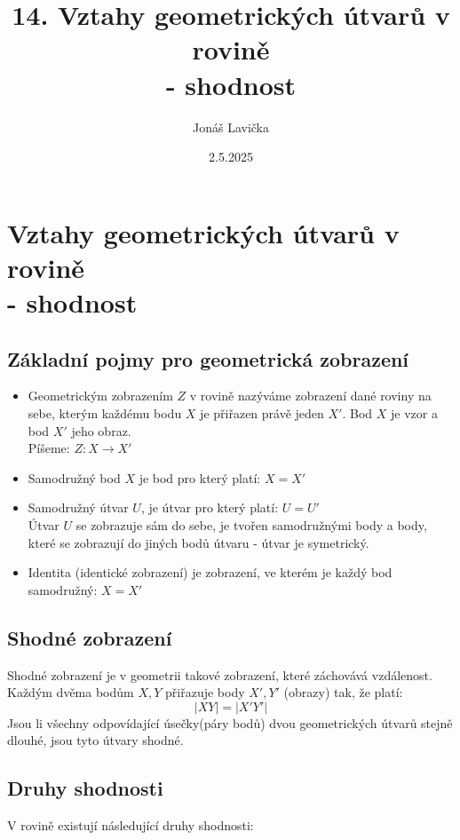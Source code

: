 \title{14. Vztahy geometrických útvarů v rovině\\ - shodnost}
\author{Jonáš Lavička}
\date{2.5.2025}

\maketitle

\section{Vztahy geometrických útvarů v rovině\\ - shodnost}
     \subsection{Základní pojmy pro geometrická zobrazení}
        \begin{itemize}
            \item Geometrickým zobrazením $Z$ v rovině nazýváme zobrazení dané roviny na sebe, kterým každému  bodu $X$ je přiřazen právě jeden $X'$. Bod $X$ je vzor a bod $X'$ jeho obraz.\\
            Píšeme: $Z: X \rightarrow X'$ 
            \item Samodružný bod $X$ je bod pro který platí: $X = X'$
            \item Samodružný útvar $U$, je útvar pro který platí: $U = U'$\\
            Útvar $U$ se zobrazuje sám do sebe, je tvořen samodružnými body a body, které se zobrazují do jiných bodů útvaru - útvar je symetrický.
            \item Identita (identické zobrazení) je zobrazení, ve kterém je každý bod samodružný: $X=X'$
        \end{itemize}

    \subsection{Shodné zobrazení}
        Shodné zobrazení je v geometrii takové zobrazení, které záchovává vzdálenost.\\
        Každým dvěma bodům $X,Y$ přiřazuje body $X',Y'$ (obrazy) tak, že platí:\\
        \[\left| XY \right| = \left| X'Y' \right|\]
        Jsou li všechny odpovídající úsečky(páry bodů) dvou geometrických útvarů stejně dlouhé, jsou tyto útvary shodné.
        
    \subsection{Druhy shodnosti}
        V rovině existují následující druhy shodnosti:
